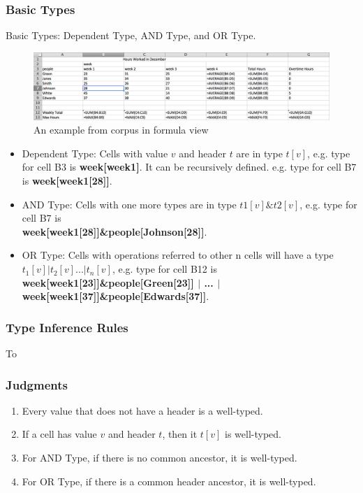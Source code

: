 \documentclass[a4paper]{article}
\begin{document}
\subsubsection{Basic Types}
Basic Types: Dependent Type, AND Type, and OR Type.
\begin{figure}[!tb]
\centering
\includegraphics[width=1\columnwidth]{formula.png}
\caption{An example from corpus in formula view}
\label{sheet}
\end{figure}

\begin{itemize}
\item Dependent Type: Cells with value $v$ and header $t$ are in type $t[v]$, e.g. type for cell B3 is \textbf{week[week1]}. It can be recursively defined. e.g. type for cell B7 is \textbf{week[week1[28]]}. 
\item AND Type: Cells with one more types are in type $t1[v]\&t2[v]$, e.g. type for cell B7 is \\
\textbf{week[week1[28]]\&people[Johnson[28]]}.
\item OR Type: Cells with operations referred to other n cells will have a type $t_1[v]|t_2[v]...|t_n[v]$, e.g. type for cell B12 is \\
\textbf{week[week1[23]]\&people[Green[23]] $|$ ... $|$ week[week1[37]]\&people[Edwards[37]]}.
\end{itemize}

\subsubsection{Type Inference Rules}
To 
\subsubsection{Judgments}
\begin{enumerate}
\item Every value that does not have a header is a well-typed.
\item If a cell has value $v$ and header $t$, then it $t[v]$ is well-typed.
\item For AND Type, if there is no common ancestor, it is well-typed. 
\item For OR Type, if there is a common header ancestor, it is well-typed.
\end{enumerate}
\end{document}
